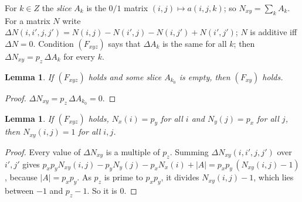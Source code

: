 \documentclass[11pt,a4paper]{amsart}
\newtheorem{lemma}[theorem]{Lemma}
\theoremstyle{definition}
\theoremstyle{remark}
\begin{document}
For $k\in Z$ the \emph{slice} $A_k$ is the $0/1$ matrix $(i,j)\mapsto a(i,j,k)$; so $N_{xy}=\sum_kA_k$. For a
matrix $N$ write $\Delta N(i,i',j,j')=N(i,j)-N(i',j)-N(i,j')+N(i',j')$; $N$ is additive iff $\Delta N=0$.
Condition $(F_{xyz})$ says that $\Delta A_k$ is the same for all $k$; then $\Delta N_{xy}=p_z\,\Delta A_k$ for
every $k$.

\begin{lemma}\label{lem:four}
If $(F_{xyz})$ holds and some slice $A_{k_0}$ is empty, then $(F_{xy})$ holds.
\end{lemma}
\begin{proof}
$\Delta N_{xy}=p_z\,\Delta A_{k_0}=0$.
\end{proof}

\begin{lemma}\label{lem:five}
If $(F_{xyz})$ holds, $N_x(i)=p_y$ for all $i$ and $N_y(j)=p_x$ for all $j$, then $N_{xy}(i,j)=1$ for all $i,j$.
\end{lemma}
\begin{proof}
Every value of $\Delta N_{xy}$ is a multiple of $p_z$. Summing $\Delta N_{xy}(i,i',j,j')$ over $i',j'$ gives
$p_xp_yN_{xy}(i,j)-p_yN_y(j)-p_xN_x(i)+|A|=p_xp_y\,(N_{xy}(i,j)-1)$, because $|A|=p_xp_y$. As $p_z$ is prime to
$p_xp_y$, it divides $N_{xy}(i,j)-1$, which lies between $-1$ and $p_z-1$. So it is $0$.
\end{proof}
\end{document}

